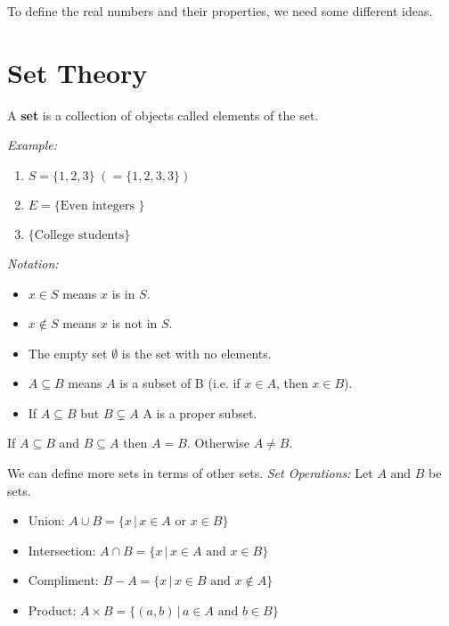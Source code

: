 \documentclass[../main.tex]{subfiles}
\begin{document}
To define the real numbers and their properties, we need some different ideas.

\section{Set Theory}

\begin{definition}[]
    A \textbf{set} is a collection of objects called elements of the set.
\end{definition}

\textit{Example:}
\begin{enumerate}
    \item \( S = \{ 1, 2, 3 \} \; (= \{ 1,2,3,3 \}) \)
    \item \( E = \{ \text{Even integers } \} \)
    \item \( \{ \text{College students} \} \)
\end{enumerate}

\textit{Notation:}
\begin{itemize}
    \item \( x \in S \) means \( x \) is in \( S \).
    \item \( x \notin S \) means \( x \) is not in \( S \).
    \item The empty set \( \emptyset \) is the set with no elements.
    \item \( A \subseteq B \) means \( A \) is a subset of B (i.e. if \( x \in A \), then \( x \in B \)).
    \item If \( A \subseteq B \) but \( B \subsetneq A \) A is a proper subset.
\end{itemize}

If \( A \subseteq B \) and \( B \subseteq A \) then \( A = B \). Otherwise \( A \neq B \).

We can define more sets in terms of other sets.
\textit{Set Operations:}
Let \( A \text{ and } B \) be sets.
\begin{itemize}
    \item Union: \( A \cup B  = \{ x \, | \, x \in A \text{ or } x \in B \}\)
    \item Intersection: \( A \cap B  = \{ x \, | \, x \in A \text{ and } x \in B \}\)
    \item Compliment: \( B - A = \{ x \, | \, x \in B \text{ and } x \notin A \} \)
    \item Product: \( A \times B = \{ (a, b) \, | \, a \in A \text{ and } b \in B \} \)
\end{itemize}
\end{document}
